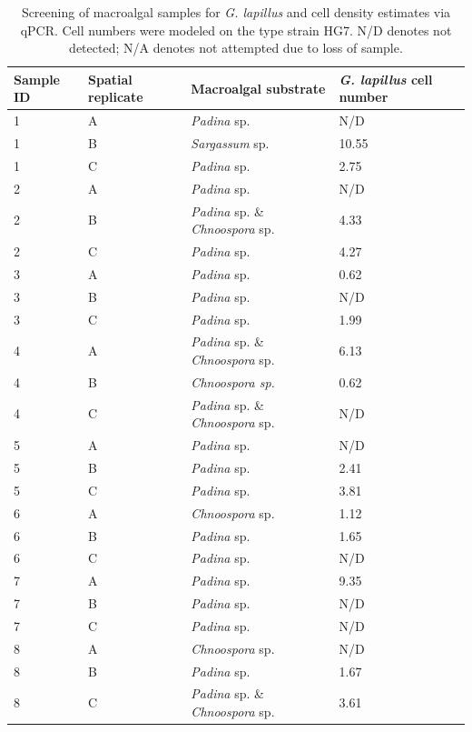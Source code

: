 \documentclass[12pt]{article}
\begin{document}
\begin{longtable}{ | p{2cm} | p{2cm} | p{3cm} | p{3.5cm} |}
\caption{Screening of macroalgal samples for \emph{G. lapillus} and cell density estimates via qPCR. Cell numbers were modeled on the type strain HG7. N/D denotes not detected; N/A denotes not attempted due to loss of sample.}\\ %
\hline
\label{tbl:MacroalgaeTable}
\textbf{Sample ID}&\textbf{Spatial replicate}&\textbf{Macroalgal substrate}&\textbf{\textit{G. lapillus} cell number}\\%
\hline
1&A&\emph{Padina} sp.&N/D\\
\hline
1&B&\emph{Sargassum} sp.&10.55
\\
\hline
1&C&\emph{Padina} sp.&2.75
\\
\hline
2&A&\emph{Padina} sp.&N/D\\
\hline
2&B&\emph{Padina} sp. \& \emph{Chnoospora} sp.&4.33\\
\hline
2&C&\emph{Padina} sp.&4.27\\
\hline
3&A&\emph{Padina} sp.&0.62
\\
\hline
3&B&\emph{Padina} sp.&N/D\\
\hline
3&C&\emph{Padina} sp.&1.99
\\
\hline
4&A&\emph{Padina} sp. \& \emph{Chnoospora} sp.&6.13
\\
\hline
4&B&\emph{Chnoospora sp.}&0.62
\\
\hline
4&C&\emph{Padina} sp. \& \emph{Chnoospora} sp.&N/D\\
\hline
5&A&\emph{Padina} sp.&N/D\\
\hline
5&B&\emph{Padina} sp.&2.41
\\
\hline
5&C&\emph{Padina} sp.&3.81
\\
\hline
6&A&\emph{Chnoospora} sp.&1.12
\\
\hline
6&B&\emph{Padina} sp.&1.65
\\
\hline
6&C&\emph{Padina} sp.&N/D\\
\hline
7
&A&\emph{Padina} sp.&9.35\\
\hline
7
&B&\emph{Padina} sp.&N/D\\
\hline
7
&C&\emph{Padina} sp.&N/D\\
\hline
8&A&\emph{Chnoospora} sp.&N/D\\
\hline
8&B&\emph{Padina} sp.&1.67
\\
\hline
8&C&\emph{Padina} sp. \& \emph{Chnoospora} sp.&3.61

\end{longtable}
\end{document}
